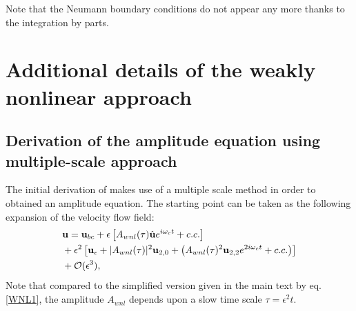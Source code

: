\documentclass[twocolumn,10pt]{asme2ej}
\newcommand{\be}[1]{ \begin{equation} \label{#1}}
\newcommand{\ee}{\end{equation}}
\begin{document}
Note that the Neumann boundary conditions do not appear any more thanks to the integration by parts.











\section{Additional details of the weakly nonlinear approach}

\subsection{Derivation of the amplitude equation using multiple-scale approach}

The initial derivation of \cite{SippLebedev} makes use of a multiple scale method in order to obtained an amplitude equation.
The starting point can be taken as the following expansion of the velocity flow field:
\be{WNL2}
\begin{aligned}
&{\bf u} = {}  {\bf u}_{bc} + \epsilon \left[ A_{wnl}(\tau)  \hat{\bf u} e^{i \omega_c t} + c.c. \right]\\
&+ \epsilon^2 \left[ {\bf u}_\epsilon + |A_{wnl}(\tau) |^2  {\bf u}_{2,0} + \left(  A_{wnl}(\tau) ^2 {\bf u}_{2,2} e^{2 i \omega_c t} + c.c. \right) \right]\\
& + {\cal O}( \epsilon ^3),
\end{aligned}
\ee
Note that compared to the simplified version given in the main text by eq. \ref{WNL1}, the amplitude $A_{wnl}$ depends upon a slow time scale 
$\tau = \epsilon^2 t$.
\end{document}
